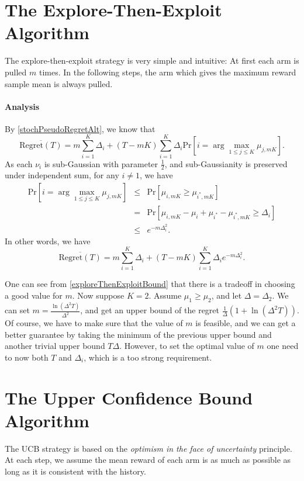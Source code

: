 \documentclass[openany]{book}
\theoremstyle{definition}
\theoremstyle{remark}
\begin{document}
\section{The Explore-Then-Exploit Algorithm}
The explore-then-exploit strategy is very simple and intuitive: At first each arm is pulled $m$ times. In the following steps, the arm which gives the maximum reward sample mean is always pulled.

\paragraph{Analysis}
By \eqref{stochPseudoRegretAlt}, we know that
\begin{equation}
    \overline{\mathrm{Regret}(T)}=m \sum_{i=1}^{K}\Delta_i+(T-mK)\sum_{i=1}^{K}\Delta_i \mathrm{Pr}[i=\arg\max_{1\le j\le K}\mu_{j,mK}].
\end{equation}
As each $\nu_i$ is sub-Gaussian with parameter $\frac{1}{2}$, and sub-Gaussianity is preserved under independent sum, for any $i\ne1$, we have
\begin{equation}
    \begin{array}{rcl}
        \displaystyle\mathrm{Pr}[i=\arg\max_{1\le j\le K}\mu_{j,mK}] & \le & \mathrm{Pr}[\mu_{i,mK}\ge\mu_{i^*,mK}] \\
         & = & \mathrm{Pr}[\mu_{i,mK}-\mu_i+\mu_{i^*}-\mu_{i^*,mK}\ge\Delta_i] \\
         & \le & e^{-m\Delta_i^2}.
    \end{array}
\end{equation}
In other words, we have
\begin{equation}\label{exploreThenExploitBound}
    \overline{\mathrm{Regret}(T)}=m \sum_{i=1}^{K}\Delta_i+(T-mK)\sum_{i=1}^{K}\Delta_ie^{-m\Delta_i^2}.
\end{equation}

One can see from \eqref{exploreThenExploitBound} that there is a tradeoff in choosing a good value for $m$. Now suppose $K=2$. Assume $\mu_1\ge\mu_2$, and let $\Delta=\Delta_2$. We can set $m=\frac{\ln(\Delta^2T)}{\Delta^2}$, and get an upper bound of the regret $\frac{1}{\Delta}(1+\ln(\Delta^2T))$. Of course, we have to make sure that the value of $m$ is feasible, and we can get a better guarantee by taking the minimum of the previous upper bound and another trivial upper bound $T\Delta$. However, to set the optimal value of $m$ one need to now both $T$ and $\Delta_i$, which is a too strong requirement.

\section{The Upper Confidence Bound Algorithm}
The UCB strategy is based on the \emph{optimism in the face of uncertainty} principle. At each step, we assume the mean reward of each arm is as much as possible as long as it is consistent with the history.
\end{document}
